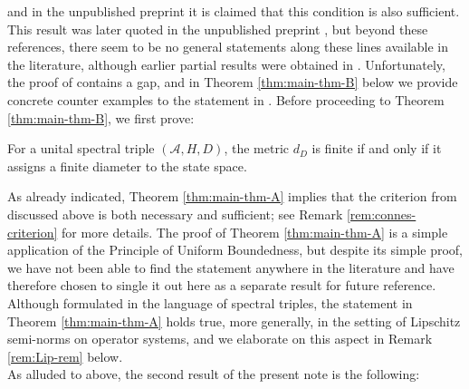 \documentclass[12pt,a4paper,twoside,reqno]{amsart}
\theoremstyle{plain}
\theoremstyle{definition}
\theoremstyle{remark} %
\theoremstyle{plain}
\numberwithin{equation}{section}
\newcommand{\A}{{\mathcal{A}}}
\begin{document}
and in the unpublished preprint \cite[Proposition B.1]{Rennie-Varilly} it is claimed that this condition is also sufficient. This result was  later quoted in the unpublished preprint \cite{BMR:DSS}, 
but beyond these references, there seem to be no general statements along these  lines available in the literature, although earlier partial results were obtained in \cite{AL:Connes-metric}. 
 Unfortunately, the proof of  \cite[Proposition B.1]{Rennie-Varilly} contains a gap, and in Theorem \ref{thm:main-thm-B} below we provide concrete counter examples to the statement in  \cite[Proposition B.1]{Rennie-Varilly}.
 Before proceeding to Theorem \ref{thm:main-thm-B}, we first prove: 


\begin{theoremletter}\label{thm:main-thm-A}
For a unital  spectral triple $(\A, H, D)$, the metric $d_D$ is finite if and only if it assigns a finite diameter to the state space. 
\end{theoremletter}
As already indicated, Theorem \ref{thm:main-thm-A} implies that the criterion from \cite[Proposition 4]{Con:CFH} discussed above is both necessary and sufficient; see Remark \ref{rem:connes-criterion} for more details. The proof of Theorem \ref{thm:main-thm-A}  is a simple application of the Principle of Uniform Boundedness, but despite its simple proof,  we have not been able to find the statement  anywhere in the literature and have therefore chosen to single it out here as a separate result for future reference. 
 Although formulated in the language of spectral triples, the statement in  Theorem \ref{thm:main-thm-A}  holds true, more generally, in the setting  of Lipschitz semi-norms on operator systems, and we elaborate on this aspect in Remark \ref{rem:Lip-rem} below.\\
 
 As alluded to above, the second result of the present note is the following:
 
\end{document}
